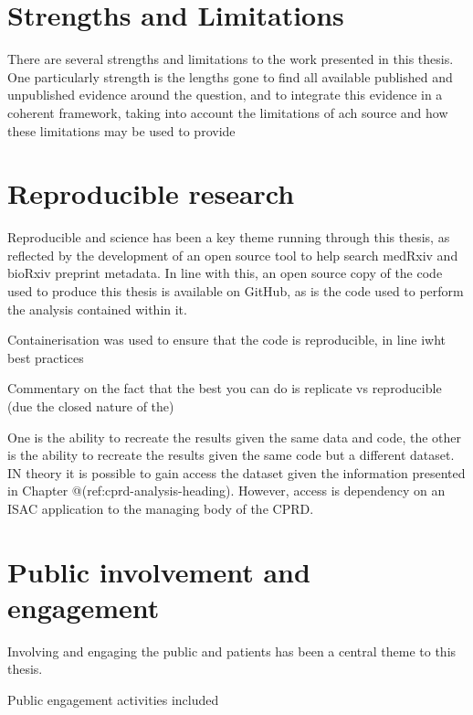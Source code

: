 \documentclass[a4paper, twoside]{templates/ociamthesis}
\begin{document}
\hypertarget{strengths-and-limitations}{%
\section{Strengths and Limitations}\label{strengths-and-limitations}}

There are several strengths and limitations to the work presented in this thesis. One particularly strength is the lengths gone to find all available published and unpublished evidence around the question, and to integrate this evidence in a coherent framework, taking into account the limitations of ach source and how these limitations may be used to provide

\hypertarget{reproducible-research}{%
\section{Reproducible research}\label{reproducible-research}}

Reproducible and science has been a key theme running through this thesis, as reflected by the development of an open source tool to help search medRxiv and bioRxiv preprint metadata. In line with this, an open source copy of the code used to produce this thesis is available on GitHub, as is the code used to perform the analysis contained within it.

Containerisation was used to ensure that the code is reproducible, in line iwht best practices

Commentary on the fact that the best you can do is replicate vs reproducible (due the closed nature of the)

One is the ability to recreate the results given the same data and code, the other is the ability to recreate the results given the same code but a different dataset. IN theory it is possible to gain access the dataset given the information presented in Chapter @(ref:cprd-analysis-heading). However, access is dependency on an ISAC application to the managing body of the CPRD.

\hypertarget{public-involvement-and-engagement}{%
\section{Public involvement and engagement}\label{public-involvement-and-engagement}}

Involving and engaging the public and patients has been a central theme to this thesis.

Public engagement activities included
\end{document}

